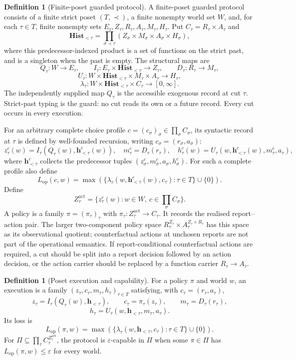 \documentclass[11pt]{article}
\theoremstyle{plain}
\theoremstyle{definition}
\newtheorem{definition}[theorem]{Definition}
\theoremstyle{remark}
\newcommand{\eps}{\varepsilon}
\begin{document}
\begin{definition}[Finite-poset guarded protocol]
\label{def:operational-feedback}
A finite-poset guarded protocol consists of a finite strict poset
$(T,\prec)$, a finite nonempty world set $W$, and, for each $\tau\in T$,
finite nonempty sets $E_\tau,Z_\tau,R_\tau,A_\tau,M_\tau,H_\tau$. Put
$C_\tau=R_\tau\times A_\tau$ and
\[
\mathbf{Hist}_{<\tau}
=\prod_{\sigma\prec\tau}
(Z_\sigma\times M_\sigma\times A_\sigma\times H_\sigma),
\]
where this predecessor-indexed product is a set of functions on the strict
past, and is a singleton when the past is empty. The structural maps are
\[
Q_\tau:W\to E_\tau,
\qquad
I_\tau:E_\tau\times\mathbf{Hist}_{<\tau}\to Z_\tau,
\qquad
D_\tau:R_\tau\to M_\tau,
\]
\[
U_\tau:W\times\mathbf{Hist}_{<\tau}\times M_\tau\times A_\tau
\to H_\tau,
\]
\[
\lambda_\tau:
W\times\mathbf{Hist}_{<\tau}\times C_\tau\to[0,\infty].
\]
The independently supplied map $Q_\tau$ is the accessible exogenous record at
cut $\tau$. Strict-past typing is the guard: no cut reads its own or a future
record. Every cut occurs in every execution.

For an arbitrary complete choice profile $c=(c_\sigma)_\sigma\in
\prod_\sigma C_\sigma$, its syntactic record at $\tau$ is defined by
well-founded recursion, writing $c_\sigma=(r_\sigma,a_\sigma)$:
\[
z_\tau^c(w)=I_\tau(Q_\tau(w),\mathbf h_{<\tau}^c(w)),
\quad m_\tau^c=D_\tau(r_\tau),
\quad
h_\tau^c(w)=U_\tau(w,\mathbf h_{<\tau}^c(w),m_\tau^c,a_\tau),
\]
where $\mathbf h_{<\tau}^c$ collects the predecessor tuples
$(z_\sigma^c,m_\sigma^c,a_\sigma,h_\sigma^c)$. For such a complete profile also define
\[
L_{\mathrm{op}}(c,w)=
\max\left(
\{\lambda_\tau(w,\mathbf h_{<\tau}^c(w),c_\tau):\tau\in T\}
\cup\{0\}\right).
\]
Define
\[
Z_\tau^{\mathrm{act}}
=\{z_\tau^c(w):w\in W,\ c\in\prod_\sigma C_\sigma\}.
\]
A policy is a family
$\pi=(\pi_\tau)_\tau$ with
$\pi_\tau:Z_\tau^{\mathrm{act}}\to C_\tau$.
It records the realised report--action pair. The larger two-component policy
space $R_\tau^{Z_\tau}\times A_\tau^{Z_\tau\times R_\tau}$ has this space as
its observational quotient; counterfactual actions at unchosen reports are not
part of the operational semantics. If report-conditional counterfactual actions
are required, a cut should be split into a report decision followed by an action
decision, or the action carrier should be replaced by a function carrier
$R_\tau\to A_\tau$.
\end{definition}

\begin{definition}[Poset execution and capability]
\label{def:operational-execution}
For a policy $\pi$ and world $w$, an execution is a family
$(z_\tau,c_\tau,m_\tau,h_\tau)_{\tau\in T}$ satisfying, with
$c_\tau=(r_\tau,a_\tau)$,
\[
z_\tau=I_\tau(Q_\tau(w),\mathbf h_{<\tau}),
\qquad c_\tau=\pi_\tau(z_\tau),
\qquad m_\tau=D_\tau(r_\tau),
\]
\[
h_\tau=U_\tau(w,\mathbf h_{<\tau},m_\tau,a_\tau).
\]
Its loss is
\[
L_{\mathrm{op}}(\pi,w)
=\max\left(
\{\lambda_\tau(w,\mathbf h_{<\tau},c_\tau):\tau\in T\}
\cup\{0\}\right).
\]
For $\Pi\subseteq\prod_\tau C_\tau^{Z_\tau^{\mathrm{act}}}$, the protocol is
$\eps$-capable in $\Pi$ when some $\pi\in\Pi$ has
$L_{\mathrm{op}}(\pi,w)\le\eps$ for every world.
\end{definition}
\end{document}
